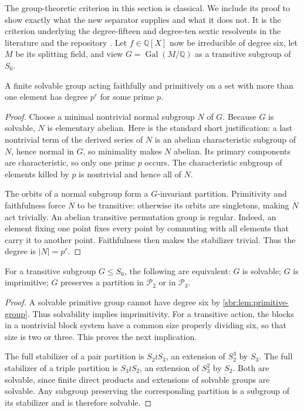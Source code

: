 \documentclass[11pt,letterpaper]{article}
\numberwithin{equation}{section}
\theoremstyle{definition}
\theoremstyle{remark}
\DeclareMathOperator{\Gal}{Gal}
\newcommand{\QQ}{\mathbb Q}
\newcommand{\Ptwo}{\mathcal P_2}
\newcommand{\Pthree}{\mathcal P_3}
\begin{document}
The group-theoretic criterion in this section is classical. We include its
proof to show exactly what the new separator supplies and what it does not.
It is the criterion underlying the degree-fifteen and degree-ten sextic
resolvents in the literature and the repository
\cite{boswell-glasser,repo-search}. Let $f\in\QQ[X]$ now be irreducible of
degree six, let $M$ be its splitting field, and view
$G=\Gal(M/\QQ)$ as a transitive subgroup of $S_6$.

\begin{lemma}
\label{sbr:lem:primitive-group}
A finite solvable group acting faithfully and primitively on a set with
more than one element has degree $p^r$ for some prime $p$.
\end{lemma}
\begin{proof}
Choose a minimal nontrivial normal subgroup $N$ of $G$. Because $G$ is
solvable, $N$ is elementary abelian. Here is the standard short justification:
a last nontrivial term of the derived series of $N$ is an abelian
characteristic subgroup of $N$, hence normal in $G$, so minimality makes
$N$ abelian. Its primary components are characteristic, so only one prime
$p$ occurs. The characteristic subgroup of elements killed by $p$ is
nontrivial and hence all of $N$.

The orbits of a normal subgroup form a $G$-invariant partition. Primitivity
and faithfulness force $N$ to be transitive: otherwise its orbits are
singletons, making $N$ act trivially. An abelian transitive permutation
group is regular. Indeed, an element fixing one point fixes every point
by commuting with all elements that carry it to another point. Faithfulness
then makes the stabilizer trivial. Thus the degree is $|N|=p^r$.
\end{proof}

\begin{proposition}
\label{sbr:prop:blocks-galois}
For a transitive subgroup $G\le S_6$, the following are equivalent:
$G$ is solvable; $G$ is imprimitive; $G$ preserves a partition in $\Ptwo$
or in $\Pthree$.
\end{proposition}
\begin{proof}
A solvable primitive group cannot have degree six by
\cref{sbr:lem:primitive-group}. Thus solvability implies imprimitivity.
For a transitive action, the blocks in a nontrivial block system have a
common size properly dividing six, so that size is two or three.
This proves the next implication.

The full stabilizer of a pair partition is $S_2\wr S_3$, an extension of
$S_2^3$ by $S_3$. The full stabilizer of a triple partition is
$S_3\wr S_2$, an extension of $S_3^2$ by $S_2$. Both are solvable,
since finite direct products and extensions of solvable groups are
solvable. Any subgroup preserving the corresponding partition is a
subgroup of its stabilizer and is therefore solvable.
\end{proof}
\end{document}
